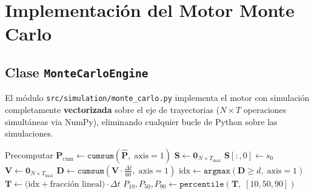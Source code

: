 \documentclass[12pt, a4paper]{article}
\theoremstyle{definition}
\begin{document}
\section{Implementación del Motor Monte Carlo}

\subsection{Clase \texttt{MonteCarloEngine}}

El módulo \texttt{src/simulation/monte\_carlo.py} implementa el motor con
simulación completamente \textbf{vectorizada} sobre el eje de trayectorias
($N \times T$ operaciones simultáneas via NumPy), eliminando cualquier
bucle de Python sobre las simulaciones.

\begin{algorithm}[H]
\SetAlgoLined
{}
\BlankLine
Precomputar $\mathbf{P}_\text{cum} \leftarrow \texttt{cumsum}(\hat{\mathbf{P}},\; \text{axis}=1)$\;
\BlankLine
{}
$\mathbf{S} \leftarrow \mathbf{0}_{N \times T_\text{max}}$ 
$\mathbf{S}[:, 0] \leftarrow s_0$\;
\For{$t = 1$ \KwTo $T_\text{max} - 1$}{
    $\mathbf{u} \sim \mathcal{U}[0,1)^N$ \tcp*{N números uniformes simultáneos}
    $\mathbf{S}[:,t] \leftarrow \bigl(\mathbf{u}_{:,\text{new}} \geq \mathbf{P}_\text{cum}[\mathbf{S}[:,t-1]]\bigr)\text{.sum}(\text{axis}=1)$\;
}
\BlankLine
{}
$\mathbf{V} \leftarrow \mathbf{0}_{N \times T_\text{max}}$\;
\BlankLine
{}
$\mathbf{D} \leftarrow \texttt{cumsum}(\mathbf{V} \cdot \frac{\Delta t}{60},\; \text{axis}=1)$\;
$\text{idx} \leftarrow \texttt{argmax}(\mathbf{D} \geq d,\; \text{axis}=1)$\;
$\mathbf{T} \leftarrow \bigl(\text{idx} + \text{fracción lineal}\bigr) \cdot \Delta t$\;
\BlankLine
\Return $P_{10}, P_{50}, P_{90} \leftarrow \texttt{percentile}(\mathbf{T},\; [10, 50, 90])$\;
\caption{Motor Monte Carlo vectorizado de UrbanFlow CDMX}
\end{algorithm}
\end{document}
